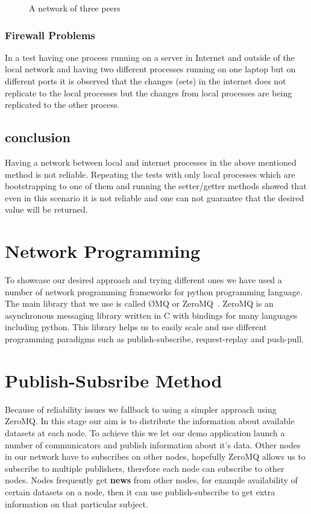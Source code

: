 \begin{figure}
\centering
{}
\caption{A network of three peers}
\label{fig:threepeers}
\end{figure}


\subsubsection{Firewall Problems}
In a test having one process running on a server in Internet and outside of the local network and having two different processes running on one laptop but on different ports it is observed that the changes (sets) in the internet does not replicate to the local processes but the changes from local processes are being replicated to the other process.

\subsection{conclusion}
Having a network between local and internet processes in the above mentioned method is not reliable. Repeating the tests with only local processes which are bootstrapping to one of them and running the setter/getter methods showed that even in this scenario it is not reliable and one can not guarantee that the desired value will be returned.


\section{Network Programming}
To showcase our desired approach and trying different ones we have used a number of network programming frameworks for python programming language. The main library that we use is called ØMQ or ZeroMQ~\cite{ZeroMQ}. ZeroMQ is an asynchronous messaging library written in C with bindings for many languages including python. This library helps us to easily scale and use different programming paradigms such as publish-subscribe, request-replay and push-pull.

\section{Publish-Subsribe Method}
Because of reliability issues we fallback to using a simpler approach using ZeroMQ. In this stage our aim is to distribute the information about available datasets at each node. To achieve this we let our demo application launch a number of communicators and publish information about it's data. Other nodes in our network have to subscribes on other nodes, hopefully ZeroMQ allows us to subscribe to multiple publishers, therefore each node can subscribe to other nodes. Nodes frequently get \textbf{news} from other nodes, for example availability of certain datasets on a node, then it can use publish-subscribe to get extra information on that particular subject.

